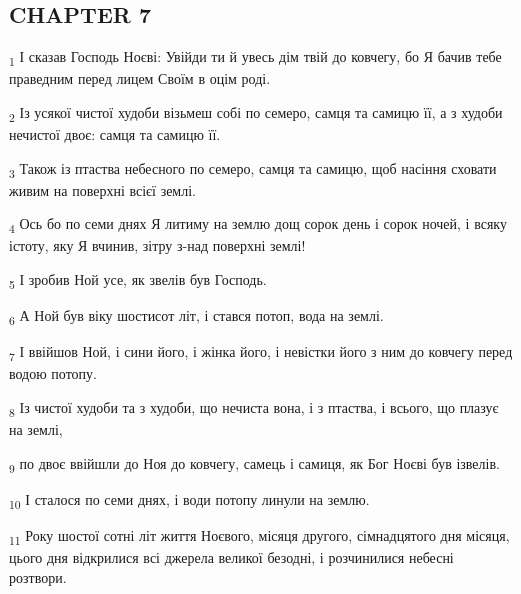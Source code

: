 \subsection{CHAPTER 7}
\begin{tcolorbox}
\textsubscript{1} І сказав Господь Ноєві: Увійди ти й увесь дім твій до ковчегу, бо Я бачив тебе праведним перед лицем Своїм в оцім роді.
\end{tcolorbox}
\begin{tcolorbox}
\textsubscript{2} Із усякої чистої худоби візьмеш собі по семеро, самця та самицю її, а з худоби нечистої двоє: самця та самицю її.
\end{tcolorbox}
\begin{tcolorbox}
\textsubscript{3} Також із птаства небесного по семеро, самця та самицю, щоб насіння сховати живим на поверхні всієї землі.
\end{tcolorbox}
\begin{tcolorbox}
\textsubscript{4} Ось бо по семи днях Я литиму на землю дощ сорок день і сорок ночей, і всяку істоту, яку Я вчинив, зітру з-над поверхні землі!
\end{tcolorbox}
\begin{tcolorbox}
\textsubscript{5} І зробив Ной усе, як звелів був Господь.
\end{tcolorbox}
\begin{tcolorbox}
\textsubscript{6} А Ной був віку шостисот літ, і стався потоп, вода на землі.
\end{tcolorbox}
\begin{tcolorbox}
\textsubscript{7} І ввійшов Ной, і сини його, і жінка його, і невістки його з ним до ковчегу перед водою потопу.
\end{tcolorbox}
\begin{tcolorbox}
\textsubscript{8} Із чистої худоби та з худоби, що нечиста вона, і з птаства, і всього, що плазує на землі,
\end{tcolorbox}
\begin{tcolorbox}
\textsubscript{9} по двоє ввійшли до Ноя до ковчегу, самець і самиця, як Бог Ноєві був ізвелів.
\end{tcolorbox}
\begin{tcolorbox}
\textsubscript{10} І сталося по семи днях, і води потопу линули на землю.
\end{tcolorbox}
\begin{tcolorbox}
\textsubscript{11} Року шостої сотні літ життя Ноєвого, місяця другого, сімнадцятого дня місяця, цього дня відкрилися всі джерела великої безодні, і розчинилися небесні розтвори.
\end{tcolorbox}
